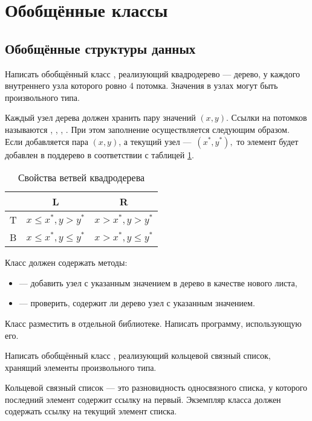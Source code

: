 \section{Обобщённые классы}

\subsection{Обобщённые структуры данных}

\task Написать обобщённый класс , реализующий
квадродерево — дерево, у каждого внутреннего узла которого ровно 4
потомка. Значения в узлах могут быть произвольного типа.

Каждый узел дерева должен хранить пару значений $(x,y)$. Ссылки на
потомков называются , , , . При этом
заполнение осуществляется следующим образом. Если добавляется пара
$(x, y)$, а текущий узел — $(x^*,y^*),$ то элемент будет добавлен в
поддерево в соответствии с таблицей \ref{table:QuadTree}.

\begin{table}[b]
  \centering
  \begin{tabular}{c|cc}
      & L   &R\\
    \hline
    T & $x \leqslant x^*, y > y^*$         & $x > x^*, y > y^*$\\
    B & $x \leqslant x^*, y \leqslant y^*$ & $x > x^*, y \leqslant y^*$
  \end{tabular}
\caption{Свойства ветвей квадродерева}\label{table:QuadTree}
\end{table}

Класс должен содержать методы:
\begin{itemize}
\item {} — добавить узел с указанным значением в дерево в
  качестве нового листа,
\item {} — проверить, содержит ли дерево узел с указанным
  значением.
\end{itemize}

Класс разместить в отдельной библиотеке. Написать программу,
использующую его.

\task Написать обобщённый класс , реализующий
кольцевой связный список, хранящий элементы произвольного
типа. 

Кольцевой связный список — это разновидность односвязного списка, у
которого последний элемент содержит ссылку на первый. Экземпляр класса
должен содержать ссылку на текущий элемент списка.

